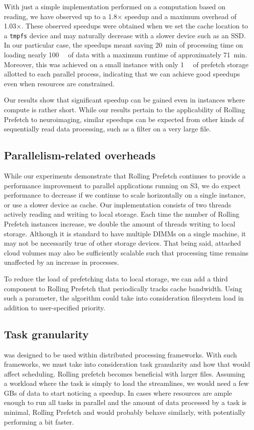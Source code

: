 \documentclass[conference]{IEEEtran}
\begin{document}
With just a simple implementation performed on a computation based on reading, we have observed up to a 1.8$\times$ speedup and a maximum overhead of 1.03$\times$. These observed speedups were
obtained when we set the cache location to a \texttt{tmpfs} device and may naturally decrease with a slower device such as an SSD. In our particular case, the speedups meant saving 20~min of processing time
on loading nearly \SI{100}{\gibi\byte} of data with a maximum runtime of approximately 71~min. Moreover, this
was achieved on a small instance with only \SI{1}{\gibi\byte} of prefetch storage allotted to each parallel
process, indicating that we can achieve good speedups even when resources are constrained. 

Our results show that significant speedup can be gained even in instances where compute is rather short. While our results
pertain to the applicability of Rolling Prefetch to neuroimaging, similar speedups can be expected from other kinds of sequentially read data processing,
such as a filter on a very large file.

\subsection{Parallelism-related overheads}

While our experiments demonstrate that Rolling Prefetch continues to provide a performance improvement to parallel
applications running on S3, we do expect  performance to decrease if we continue to scale horizontally on
a single instance, or use a slower device as cache. Our implementation consists of two threads actively reading and writing to local storage. Each time the number of Rolling
Prefetch instances increase, we double the amount of threads writing to local storage. Although it is standard
to have multiple DIMMs on a single machine, it may
not be necessarily true of other storage devices. That being said, attached cloud volumes may
also be sufficiently scalable such that processing time remains unaffected by an increase in processes.

To reduce the load of prefetching data to local storage, we can add a third component to Rolling Prefetch that periodically tracks cache bandwidth. Using such a parameter, the algorithm could take into consideration filesystem 
load in addition to user-specified priority.


\subsection{Task granularity}
\sfs was designed to be used within distributed processing frameworks. With such frameworks, we must take into consideration task granularity and how that would affect
scheduling. Rolling prefetch becomes beneficial with larger files. Assuming a workload where the task is simply to load the streamlines, we would need a few
GBs of data to start noticing a speedup. In cases where resources are ample enough to run all tasks in
parallel and the amount of data processed by a task is minimal, Rolling Prefetch and \sfs would probably behave
similarly, with \sfs potentially performing a bit faster.
\end{document}
